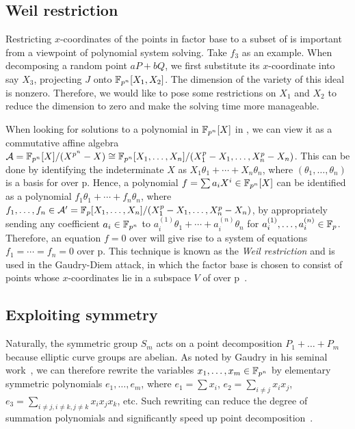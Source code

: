 \subsection{Weil restriction}
\label{sec:weil-restriction}
%
Restricting $x$-coordinates of the points in factor base to a subset
of  is important from a viewpoint of polynomial system solving.
%
Take $f_3$ as an example.
%
When decomposing a random point $aP+bQ$, we first substitute its
$x$-coordinate into say $X_3$, projecting $J$ onto $\mathbb F_{p^n}[X_1,X_2]$.
%
The dimension of the variety of this ideal is nonzero.
%
Therefore, we would like to pose some restrictions on $X_1$ and $X_2$
to reduce the dimension to zero and make the solving time more
manageable.

When looking for solutions to a polynomial in $\mathbb F_{p^n}[X]$ in ,
we can view it as a commutative affine algebra
$\mathcal A=\mathbb F_{p^n}[X]/(X^{p^n} -
X)\cong\mathbb F_{p^n}[X_1,\ldots,X_n]/(X_1^p - X_1,\ldots,X_n^p - X_n)$.
%
This can be done by identifying the indeterminate $X$ as
$X_1\theta_1+\cdots+X_n\theta_n$, where $(\theta_1,\ldots,\theta_n)$
is a basis for  over \F p.
%
Hence, a polynomial $f=\sum a_iX^i\in\mathbb F_{p^n}[X]$ can be identified as
a polynomial $f_1\theta_1+\cdots+f_n\theta_n$, where
$f_1,\ldots,f_n\in\mathcal A'=\mathbb F_{p}[X_1,\ldots,X_n]/(X_1^p -
X_1,\ldots,X_n^p - X_n)$, by appropriately sending any coefficient
$a_i\in\mathbb F_{p^n}$ to $a_i^{(1)}\theta_1+\cdots+a_i^{(n)}\theta_n$ for
$a_i^{(1)},\ldots,a_i^{(n)}\in\mathbb F_{p}$.
%
Therefore, an equation $f=0$ over  will give rise to a system
of equations $f_1=\cdots=f_n=0$ over \F p.
%
This technique is known as the \emph{Weil restriction} and is used in
the Gaudry-Diem attack, in which the factor base is chosen to consist
of points whose $x$-coordinates lie in a subspace $V$ of  over
\F p~\cite{DBLP:journals/jsc/Gaudry09,DBLP:journals/moc/Diem11}.

\subsection{Exploiting symmetry}
%
\label{sec:exploit-symmetry}
%
Naturally, the symmetric group $S_m$ acts on a point decomposition
$P_1+\ldots+P_m$ because elliptic curve groups are abelian.
%
As noted by Gaudry in his seminal
work~\cite{DBLP:journals/jsc/Gaudry09}, we can therefore rewrite the
variables $x_1,\ldots,x_m\in\mathbb F_{p^n}$ by elementary symmetric
polynomials $e_1,\ldots,e_m$, where $e_1=\sum x_i$,
$e_2=\sum_{i\neq j}x_ix_j$,
$e_3=\sum_{i\neq j,i\neq k,j\neq k}x_ix_jx_k$, etc.
%
Such rewriting can reduce the degree of summation polynomials and
significantly speed up point
decomposition~\cite{DBLP:conf/eurocrypt/FaugerePPR12,DBLP:conf/iwsec/HuangPST13}.

